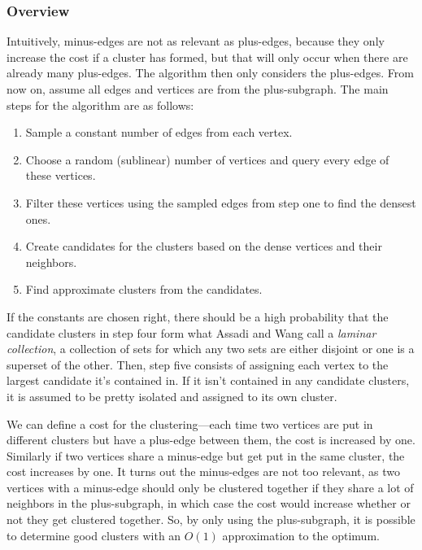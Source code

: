 \documentclass[
]{article}
\providecommand{\tightlist}{%
  \setlength{\itemsep}{0pt}\setlength{\parskip}{0pt}}
\begin{document}
\hypertarget{overview}{%
  \subsubsection{Overview}\label{overview}}

Intuitively, minus-edges are not as relevant as plus-edges, because they only increase the cost if a cluster has formed, but that will only occur when there are already many plus-edges. The algorithm then only considers the plus-edges. From now on, assume all edges and vertices are from the plus-subgraph. The main steps for the algorithm are as follows:

\begin{enumerate}
  \tightlist
  \item
        Sample a constant number of edges from each vertex.
  \item
        Choose a random (sublinear) number of vertices and query every edge of
        these vertices.
  \item
        Filter these vertices using the sampled edges from step one to find
        the densest ones.
  \item
        Create candidates for the clusters based on the dense vertices and
        their neighbors.
  \item
        Find approximate clusters from the candidates.
\end{enumerate}

If the constants are chosen right, there should be a high probability
that the candidate clusters in step four form what Assadi and Wang call
a \emph{laminar collection}, a collection of sets for which any two sets
are either disjoint or one is a superset of the other. Then,
step five consists of assigning each vertex to the largest candidate
it's contained in. If it isn't contained
in any candidate clusters, it is assumed to be pretty isolated and
assigned to its own cluster.

We can define a cost for the clustering---each time two vertices are
put in different clusters but have a plus-edge between them, the cost is
increased by one. Similarly if two vertices share a minus-edge but get
put in the same cluster, the cost increases by one. It turns out the
minus-edges are not too relevant, as two vertices with a minus-edge
should only be clustered together if they share a lot of neighbors in
the plus-subgraph, in which case the cost would increase whether or not
they get clustered together. So, by only using the plus-subgraph, it is
possible to determine good clusters with an {\(O(1)\)} approximation to
the optimum.
\end{document}
